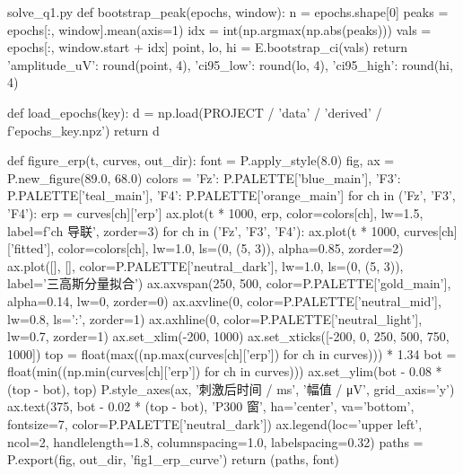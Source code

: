 \documentclass[bwprint]{gmcmthesis}
\begin{document}
\begin{appendices}
\begin{Python}{solve\_q1.py}
def bootstrap_peak(epochs, window):
    n = epochs.shape[0]
    peaks = epochs[:, window].mean(axis=1)
    idx = int(np.argmax(np.abs(peaks)))
    vals = epochs[:, window.start + idx]
    point, lo, hi = E.bootstrap_ci(vals)
    return {'amplitude_uV': round(point, 4), 'ci95_low': round(lo, 4), 'ci95_high': round(hi, 4)}

def load_epochs(key):
    d = np.load(PROJECT / 'data' / 'derived' / f'epochs_{key}.npz')
    return d

def figure_erp(t, curves, out_dir):
    font = P.apply_style(8.0)
    fig, ax = P.new_figure(89.0, 68.0)
    colors = {'Fz': P.PALETTE['blue_main'], 'F3': P.PALETTE['teal_main'], 'F4': P.PALETTE['orange_main']}
    for ch in ('Fz', 'F3', 'F4'):
        erp = curves[ch]['erp']
        ax.plot(t * 1000, erp, color=colors[ch], lw=1.5, label=f'{ch} 导联', zorder=3)
    for ch in ('Fz', 'F3', 'F4'):
        ax.plot(t * 1000, curves[ch]['fitted'], color=colors[ch], lw=1.0, ls=(0, (5, 3)), alpha=0.85, zorder=2)
    ax.plot([], [], color=P.PALETTE['neutral_dark'], lw=1.0, ls=(0, (5, 3)), label='三高斯分量拟合')
    ax.axvspan(250, 500, color=P.PALETTE['gold_main'], alpha=0.14, lw=0, zorder=0)
    ax.axvline(0, color=P.PALETTE['neutral_mid'], lw=0.8, ls=':', zorder=1)
    ax.axhline(0, color=P.PALETTE['neutral_light'], lw=0.7, zorder=1)
    ax.set_xlim(-200, 1000)
    ax.set_xticks([-200, 0, 250, 500, 750, 1000])
    top = float(max((np.max(curves[ch]['erp']) for ch in curves))) * 1.34
    bot = float(min((np.min(curves[ch]['erp']) for ch in curves)))
    ax.set_ylim(bot - 0.08 * (top - bot), top)
    P.style_axes(ax, '刺激后时间 / ms', '幅值 / μV', grid_axis='y')
    ax.text(375, bot - 0.02 * (top - bot), 'P300 窗', ha='center', va='bottom', fontsize=7, color=P.PALETTE['neutral_dark'])
    ax.legend(loc='upper left', ncol=2, handlelength=1.8, columnspacing=1.0, labelspacing=0.32)
    paths = P.export(fig, out_dir, 'fig1_erp_curve')
    return (paths, font)


\end{Python}
\end{appendices}
\end{document}
